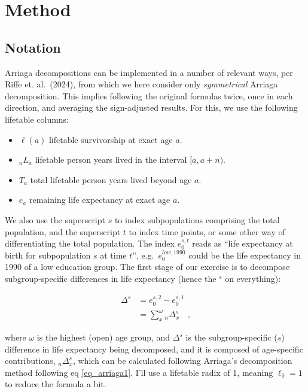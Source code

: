 \documentclass[sn-apa,pdflatex]{sn-jnl}
\theoremstyle{remark}
\theoremstyle{definition}
\begin{document}
\hypertarget{method}{%
\section{Method}\label{method}}

\hypertarget{notation}{%
\subsection{Notation}\label{notation}}

Arriaga decompositions can be implemented in a number of relevant ways,
per Riffe et. al.~(2024), from which we here consider only
\emph{symmetrical} Arriaga decomposition. This implies following the
original formulas twice, once in each direction, and averaging the
sign-adjusted results. For this, we use the following lifetable columns:

\begin{itemize}

\item{$\ell(a)$} lifetable survivorship at exact age $a$.

\item{${}_nL_a$} lifetable person years lived in the interval $[a,a+n)$.

\item{$T_a$} total lifetable person years lived beyond age $a$.

\item{$e_a$} remaining life expectancy at exact age $a$.

\end{itemize}

We also use the superscript \(s\) to index subpopulations comprising the
total population, and the superscript \(t\) to index time points, or
some other way of differentiating the total population. The index
\(e^{s,t}_0\) reads as ``life expectancy at birth for subpopulation
\(s\) at time \(t\)'', e.g.~\(e^{low, 1990}_0\) could be the life
expectancy in 1990 of a low education group. The first stage of our
exercise is to decompose subgroup-specific differences in life
expectancy (hence the \(^s\) on everything):

\begin{align}
{}\Delta^s &= e_0^{s,2} - e_0^{s,1}  \\
 &= \sum _x^\omega {}_n\Delta_x^s \quad \textrm{,}\nonumber 
\end{align}

\noindent where \(\omega\) is the highest (open) age group, and
\(\Delta^s\) is the subgroup-specific (\(s\)) difference in life
expectancy being decomposed, and it is composed of age-specific
contributions, \({}_n\Delta_x^s\), which can be calculated following
Arriaga's decomposition method following eq \eqref{eq_arriaga1}. I'll
use a lifetable radix of 1, meaning \(\ell_0 = 1\) to reduce the formula
a bit.
\end{document}
